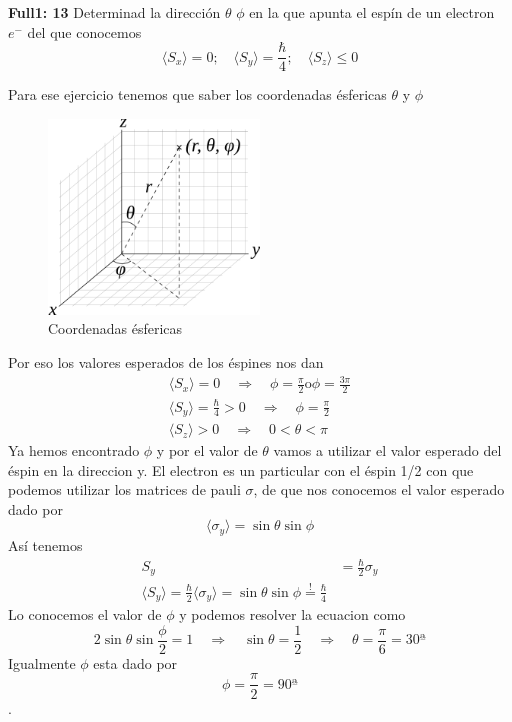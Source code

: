 \begin{ejercicio}
	\textbf{Full1: 13} Determinad la dirección $\theta$ $\phi$ en la que
apunta el espín de un electron $e^-$ del que conocemos
$$
	\langle S_x \rangle = 0; \quad \langle S_y \rangle = \frac{\hbar}{4}; \quad
\langle S_z \rangle \leq 0 
$$
\end{ejercicio}
\begin{solucion}
Para ese ejercicio tenemos que saber los coordenadas ésfericas $\theta$ y $\phi$
\begin{figure}
	\center
	\includegraphics[width=0.5\textwidth]{Images/sphericalCoordinates.png}
	\caption{Coordenadas ésfericas}
\end{figure}
Por eso los valores esperados de los éspines nos dan
\begin{align*}
	\langle S_x \rangle = 0 \quad \Rightarrow \quad \phi = \frac{\pi}{2}
\text{o} \phi = \frac{3\pi}{2} \\
	\langle S_y \rangle = \frac{\hbar}{4} > 0 \quad \Rightarrow \quad
\phi=\frac{\pi}{2} \\
	\langle S_z \rangle > 0 \quad \Rightarrow \quad 0 < \theta < \pi
\end{align*}
Ya hemos encontrado $\phi$ y por el valor de $\theta$ vamos a utilizar el valor
esperado del éspin en la direccion y. El electron es un particular con el éspin
1/2 con que podemos utilizar los matrices de pauli $\sigma$, de que nos
conocemos el valor esperado dado por
$$
	\langle \sigma_y \rangle =\sin \theta  \sin \phi
$$
Así tenemos
\begin{align*}
	S_y &= \frac{\hbar}{2} \sigma_y \\
	\langle S_y \rangle = \frac{\hbar}{2} \langle \sigma _ y \rangle = \sin
\theta \sin \phi \overset{!}{=} \frac{\hbar}{4}
\end{align*}
Lo conocemos el valor de $\phi$ y podemos resolver la ecuacion como
$$
	2 \sin \theta \sin \frac{\phi}{2} = 1 \quad \Rightarrow \quad \sin \theta =
\frac{1}{2} \quad \Rightarrow \quad \theta = \frac{\pi}{6} = 30ª  
$$
Igualmente $\phi$ esta dado por
$$
	\phi = \frac{\pi}{2} = 90ª
$$.

\end{solucion}


